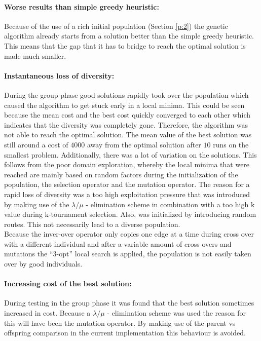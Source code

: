 \documentclass[a4paper,10pt]{article}
\begin{document}
\paragraph{Worse results than simple greedy heuristic:}Because of the use of a rich initial population (Section \ref{p:2}) the genetic algorithm already starts from a solution better than the simple greedy heuristic. This means that the gap that it has to bridge to reach the optimal solution is made much smaller.

\paragraph{Instantaneous loss of diversity:} During the group phase good solutions rapidly took over the population which caused the algorithm to get stuck early in a local minima. This could be seen because the mean cost and the best cost quickly converged to each other which indicates that the diversity was completely gone. Therefore, the algorithm was not able to reach the optimal solution. The mean value of the best solution was still around a cost of $4000$ away from the optimal solution after $10$ runs on the smallest problem. Additionally, there was a lot of variation on the solutions. This follows from the poor domain exploration, whereby the local minima that were reached are mainly based on random factors during the initialization of the population, the selection operator and the mutation operator. The reason for a rapid loss of diversity was a too high exploitation pressure that was introduced by making use of the $\lambda/\mu$ - elimination scheme in combination with a too high k value during k-tournament selection. Also, was initialized by introducing random routes. This not necessarily lead to a diverse population. \\
Because the inver-over operator only copies one edge at a time during cross over with a different individual and after a variable amount of cross overs and mutations the ``3-opt'' local search is applied, the population is not easily taken over by good individuals. 


\paragraph{Increasing cost of the best solution:} During testing in the group phase it was found that the best solution sometimes increased in cost. Because a $\lambda/\mu$ - elimination scheme was used the reason for this will have been the mutation operator. By making use of the parent vs offspring comparison in the current implementation this behaviour is avoided. 
\end{document}
